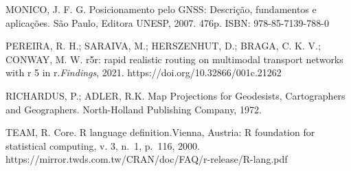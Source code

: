 \documentclass[
  letterpaper,
  DIV=11,
  numbers=noendperiod]{scrreprt}
\begin{document}
MONICO, J. F. G. Posicionamento pelo GNSS: Descrição, fundamentos e
aplicações. São Paulo, Editora UNESP, 2007. 476p. ISBN:
978-85-7139-788-0

PEREIRA, R. H.; SARAIVA, M.; HERSZENHUT, D.; BRAGA, C. K. V.; CONWAY, M.
W. r5r: rapid realistic routing on multimodal transport networks with r
5 in r.\emph{Findings}, 2021. https://doi.org/10.32866/001c.21262

RICHARDUS, P.; ADLER, R.K. Map Projections for Geodesists, Cartographers
and Geographers. North-Holland Publishing Company, 1972.

TEAM, R. Core. R language definition.Vienna, Austria: R foundation for
statistical computing, v. 3, n.~1, p.~116, 2000.
https://mirror.twds.com.tw/CRAN/doc/FAQ/r-release/R-lang.pdf
\end{document}
